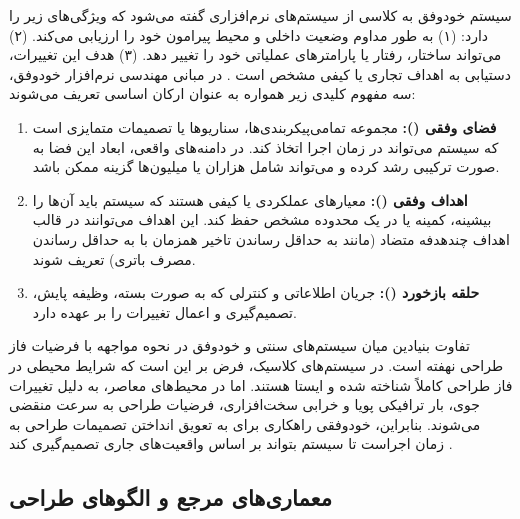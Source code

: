 \documentclass[oneside,openany,phd]{TMU-Thesis}
\begin{document}
سیستم خودوفق به کلاسی از سیستم‌های نرم‌افزاری گفته می‌شود که ویژگی‌های زیر را دارد: (۱) به طور مداوم وضعیت داخلی و محیط پیرامون خود را ارزیابی می‌کند. (۲) می‌تواند ساختار، رفتار یا پارامترهای عملیاتی خود را تغییر دهد. (۳) هدف این تغییرات، دستیابی به اهداف تجاری یا کیفی مشخص است \cite{kephart2003vision}. در مبانی مهندسی نرم‌افزار خودوفق، سه مفهوم کلیدی زیر همواره به عنوان ارکان اساسی تعریف می‌شوند:
\begin{enumerate}
    \item \textbf{فضای وفقی ():} مجموعه تمامی‌پیکربندی‌ها، سناریوها یا تصمیمات متمایزی است که سیستم می‌تواند در زمان اجرا اتخاذ کند. در دامنه‌های واقعی، ابعاد این فضا به صورت ترکیبی رشد کرده و می‌تواند شامل هزاران یا میلیون‌ها گزینه ممکن باشد.
    \item \textbf{اهداف وفقی ():} معیارهای عملکردی یا کیفی هستند که سیستم باید آن‌ها را بیشینه، کمینه یا در یک محدوده مشخص حفظ کند. این اهداف می‌توانند در قالب اهداف چندهدفه متضاد (مانند به حداقل رساندن تاخیر همزمان با به حداقل رساندن مصرف باتری) تعریف شوند.
    \item \textbf{حلقه بازخورد ():} جریان اطلاعاتی و کنترلی که به صورت بسته، وظیفه پایش، تصمیم‌گیری و اعمال تغییرات را بر عهده دارد.
\end{enumerate}

تفاوت بنیادین میان سیستم‌های سنتی و خودوفق در نحوه مواجهه با فرضیات فاز طراحی نهفته است. در سیستم‌های کلاسیک، فرض بر این است که شرایط محیطی در فاز طراحی کاملاً شناخته شده و ایستا هستند. اما در محیط‌های معاصر، به دلیل تغییرات جوی، بار ترافیکی پویا و خرابی سخت‌افزاری، فرضیات طراحی به سرعت منقضی می‌شوند. بنابراین، خودوفقی راهکاری برای به تعویق انداختن تصمیمات طراحی به زمان اجراست تا سیستم بتواند بر اساس واقعیت‌های جاری تصمیم‌گیری کند \cite{oreizy1999architecture}.

\subsection{معماری‌های مرجع و الگوهای طراحی}
\end{document}
